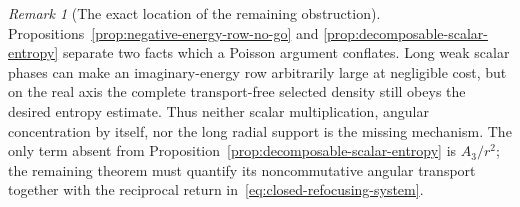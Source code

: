 \documentclass[11pt]{article}
\theoremstyle{definition}
\theoremstyle{remark}
\newtheorem{remark}[theorem]{Remark}
\begin{document}
\begin{remark}[The exact location of the remaining obstruction]
\label{rem:only-angular-transport-remains}
Propositions~\ref{prop:negative-energy-row-no-go} and
\ref{prop:decomposable-scalar-entropy} separate two facts which a Poisson
argument conflates.  Long weak scalar phases can make an imaginary-energy row
arbitrarily large at negligible cost, but on the real axis the complete
transport-free selected density still obeys the desired entropy estimate.
Thus neither scalar multiplication, angular concentration by itself, nor the
long radial support is the missing mechanism.  The only term absent from
Proposition~\ref{prop:decomposable-scalar-entropy} is $A_3/r^2$; the remaining
theorem must quantify its noncommutative angular transport together with the
reciprocal return in~\eqref{eq:closed-refocusing-system}.
\end{remark}
\end{document}
